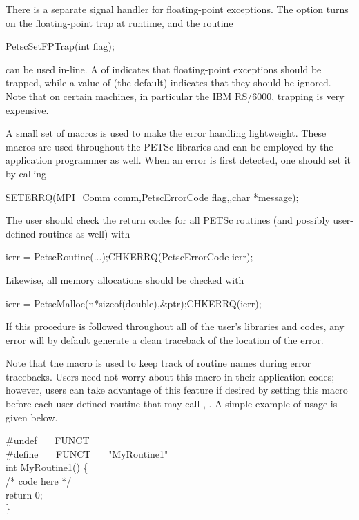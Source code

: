 {{{There is a separate signal handler for floating-point exceptions.
  
The option  turns on the floating-point trap at runtime,
and the routine  
\begin{tabbing}
  PetscSetFPTrap(int flag);
\end{tabbing}
can be used in-line.
A  of  
indicates that floating-point exceptions should be trapped,
while a value of  (the default) indicates that they 
should be ignored.  Note that on certain machines, in particular 
the IBM RS/6000, trapping is very expensive.

A small set of macros is used to make the error handling lightweight.
These macros are used throughout the PETSc libraries and can be employed
by the application   
programmer as well.  When an error is first detected, 
one should set it by calling
\begin{tabbing}
   SETERRQ(MPI_Comm comm,PetscErrorCode flag,,char *message);
\end{tabbing}
The user should check the return codes for all PETSc routines (and
possibly user-defined routines as well) with 
\begin{tabbing}
  ierr = PetscRoutine(...);CHKERRQ(PetscErrorCode ierr);
\end{tabbing}
Likewise, all memory allocations should be checked with 
\begin{tabbing}
  ierr = PetscMalloc(n*sizeof(double),\&ptr);CHKERRQ(ierr);
\end{tabbing}
If this procedure is followed throughout all of the user's libraries 
and codes, any error will by default generate a clean traceback of 
the location  
of the error. 

Note that the macro  is used to keep track of
routine names during error tracebacks.  Users need not worry about this
macro in their application codes; however, users can take advantage of this feature
if desired by setting this macro before each user-defined routine
that may call , .
A simple example of usage is given below.
\begin{tabbing}
    \#undef \_\_FUNCT\_\_  \\
    \#define \_\_FUNCT\_\_ "MyRoutine1"\\
    int MyRoutine1() \{ \\
        /* code here */\\
        return 0;\\
    \}
\end{tabbing}

}}}
